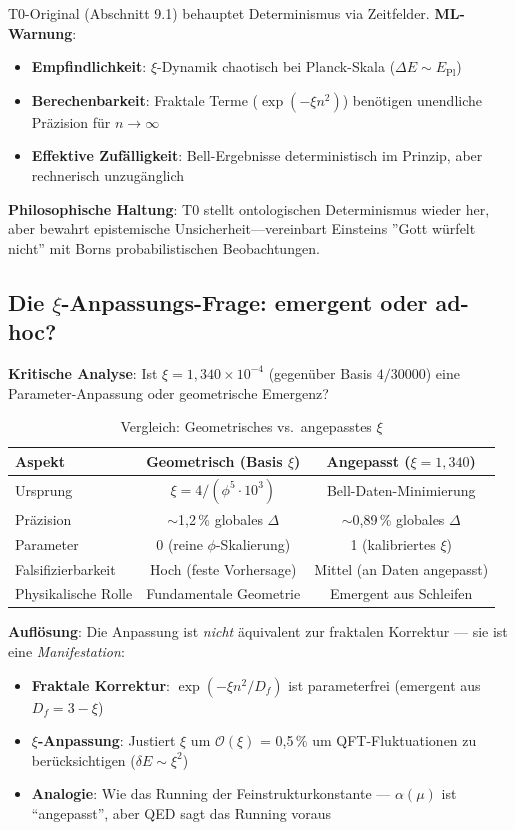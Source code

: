 	T0-Original (Abschnitt 9.1) behauptet Determinismus via Zeitfelder. \textbf{ML-Warnung}:
	\begin{itemize}
		\item \textbf{Empfindlichkeit}: $\xi$-Dynamik chaotisch bei Planck-Skala ($\Delta E \sim E_{\text{Pl}}$)
		\item \textbf{Berechenbarkeit}: Fraktale Terme ($\exp(-\xi n^2)$) benötigen unendliche Präzision für $n\to\infty$
		\item \textbf{Effektive Zufälligkeit}: Bell-Ergebnisse deterministisch im Prinzip, aber rechnerisch unzugänglich
	\end{itemize}
	\textbf{Philosophische Haltung}: T0 stellt ontologischen Determinismus wieder her, aber bewahrt epistemische Unsicherheit—vereinbart Einsteins ''Gott würfelt nicht'' mit Borns probabilistischen Beobachtungen.
	
		\subsection{Die $\xi$-Anpassungs-Frage: emergent oder ad-hoc?}
	
	\textbf{Kritische Analyse}: Ist $\xi = 1{,}340\times10^{-4}$ (gegenüber Basis $4/30000$) eine Parameter-Anpassung oder geometrische Emergenz?
	
	\begin{table}[htbp]
		\centering
		\begin{tabular}{lcc}
			\toprule
			\textbf{Aspekt} & \textbf{Geometrisch (Basis $\xi$)} & \textbf{Angepasst ($\xi=1{,}340$)} \\
			\midrule
			Ursprung & $\xi = 4/(\phi^5 \cdot 10^3)$ & Bell-Daten-Minimierung \\
			Präzision & $\sim$1{,}2\,\% globales $\Delta$ & $\sim$0{,}89\,\% globales $\Delta$ \\
			Parameter & 0 (reine $\phi$-Skalierung) & 1 (kalibriertes $\xi$) \\
			Falsifizierbarkeit & Hoch (feste Vorhersage) & Mittel (an Daten angepasst) \\
			Physikalische Rolle & Fundamentale Geometrie & Emergent aus Schleifen \\
			\bottomrule
		\end{tabular}
		\caption{Vergleich: Geometrisches vs.~angepasstes $\xi$}
	\end{table}
	
	\textbf{Auflösung}: Die Anpassung ist \textit{nicht} äquivalent zur fraktalen Korrektur --- sie ist eine \textit{Manifestation}:
	\begin{itemize}
		\item \textbf{Fraktale Korrektur}: $\exp(-\xi n^2/D_f)$ ist parameterfrei (emergent aus $D_f=3-\xi$)
		\item \textbf{$\xi$-Anpassung}: Justiert $\xi$ um $\mathcal{O}(\xi)$ = 0{,}5\,\% um QFT-Fluktuationen zu berücksichtigen ($\delta E \sim \xi^2$)
		\item \textbf{Analogie}: Wie das Running der Feinstrukturkonstante --- $\alpha(\mu)$ ist ``angepasst'', aber QED sagt das Running voraus
	\end{itemize}
	
